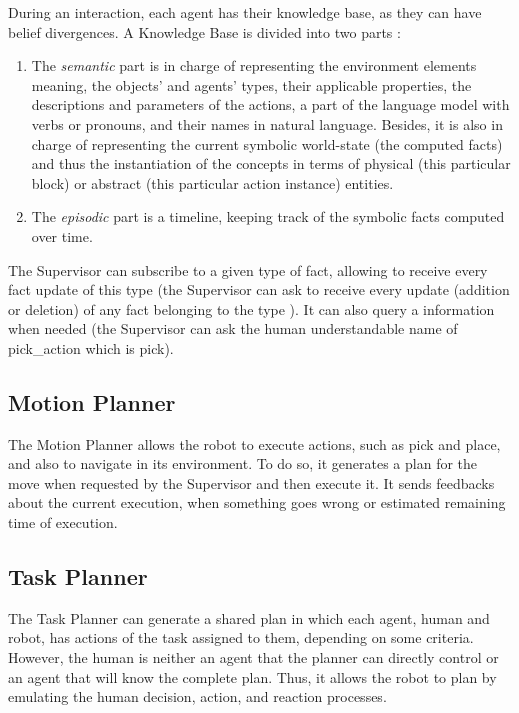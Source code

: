 \documentclass[a4paper,11pt,twoside]{StyleThese}
\begin{document}
During an interaction, each agent has their knowledge base, as they can have belief divergences. A Knowledge Base is divided into two parts :
\begin{enumerate}
	\item The \textit{semantic} part is in charge of representing the environment elements meaning, the objects' and agents' types, their applicable properties, the descriptions and parameters of the actions, a part of the language model with verbs or pronouns, and their names in natural language. Besides, it is also in charge of representing the current symbolic world-state (the computed facts) and thus the instantiation of the concepts in terms of physical (\eg this particular block) or abstract (\eg this particular action instance) entities.
	\item  The \textit{episodic} part is a timeline, keeping track of the symbolic facts computed over time.
\end{enumerate}

The Supervisor can subscribe to a given type of fact, allowing to receive every fact update of this type (\eg the Supervisor can ask to receive every update (addition or deletion) of any fact belonging to the type ). It can also query a information when needed (\eg the Supervisor can ask the human understandable name of pick\_action which is pick).

\subsection{Motion Planner}
The Motion Planner allows the robot to execute actions, such as pick and place, and also to navigate in its environment. To do so, it generates a plan for the move when requested by the Supervisor and then execute it. It sends feedbacks about the current execution, \eg when something goes wrong or estimated remaining time of execution.

\subsection{Task Planner}
The Task Planner can generate a shared plan in which each agent, human and robot, has actions of the task assigned to them, depending on some criteria. However, the human is neither an agent that the planner can directly control or an agent that will know the complete plan. Thus, it allows the robot to plan by emulating the human decision, action, and reaction processes. 
\end{document}

